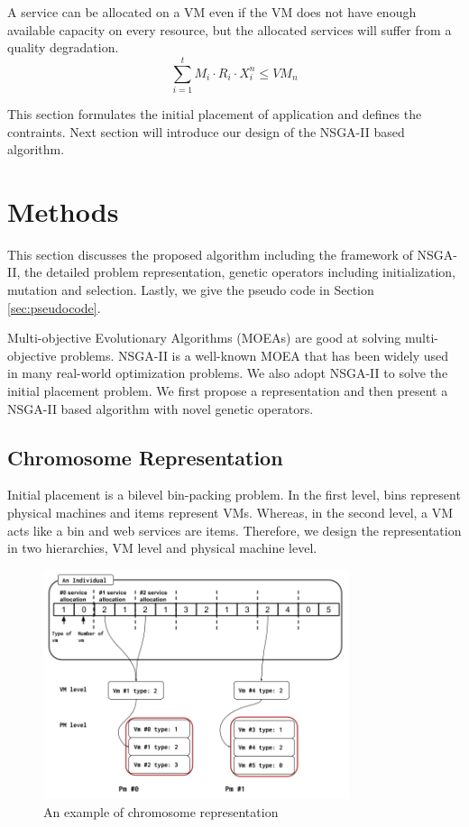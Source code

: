 A service can be allocated on a VM even if the 
VM does not have enough available capacity on every resource, but the allocated services will suffer from a quality degradation.
\begin{equation}
\sum\limits_{i=1}^t M_i \cdot R_i \cdot X_i^n  \leq VM_n
\end{equation}


This section formulates the initial placement of application and defines the contraints. Next section will introduce our design of the NSGA-II based algorithm.
\section{Methods}
\label{sec:method}
This section discusses the proposed algorithm including the framework of NSGA-II, the 
detailed problem representation, genetic operators including initialization, mutation and selection.
Lastly, we give the pseudo code in Section \ref{sec:pseudocode}.

Multi-objective Evolutionary Algorithms (MOEAs) are good at solving 
multi-objective problems. 
NSGA-II \cite{nsgaii} is a well-known MOEA that has been widely used in many real-world optimization problems. 
We also adopt NSGA-II to solve the initial placement problem. 
We first propose a representation and then present a NSGA-II based algorithm with novel genetic operators.

\subsection{Chromosome Representation}
\label{sec:representation}
Initial placement is a bilevel bin-packing problem. In the first level, 
bins represent physical machines and items represent VMs. Whereas, in the second level, a VM acts like a bin and web services are items. 
Therefore, we design the representation in two hierarchies, VM level and physical machine level. 

\begin{figure}
\centering
  \includegraphics[width=0.8\textwidth]{pics/preliminary/cec.png}
  \caption{An example of chromosome representation}
  \label{fig:rep}
\end{figure}

